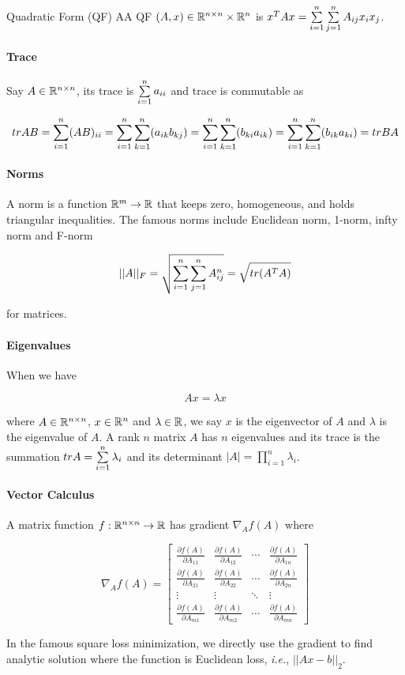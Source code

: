 \documentclass[a4,10pt]{ctexart}
\begin{document}
\begin{dn}{Quadratic Form (QF)}
AA QF $(A,x) \in \mathbb{R}^{n \times n} \times \mathbb{R}^n$ is $x^TAx = \sum \limits_{i=1}^n \sum \limits_{j=1}^n A_{ij} x_ix_j$.
\end{dn}

\paragraph{Trace}

Say $A \in \mathbb{R}^{n \times n}$, its trace is $\sum \limits_{i=1}^n a_{ii}$ and trace is commutable as

\begin{equation}
    trAB = \sum \limits_{i=1}^n (AB)_{ii} = \sum \limits_{i=1}^n \sum \limits_{k=1}^n (a_{ik} b_{kj}) = \sum \limits_{i=1}^n \sum \limits_{k=1}^n (b_{ki} a_{ik}) = \sum \limits_{i=1}^n \sum \limits_{k=1}^n (b_{ik} a_{ki}) = trBA
\end{equation}


\paragraph{Norms}

A norm is a function $\mathbb{R}^m \to \mathbb{R}$ that keeps zero, homogeneous, and holds triangular inequalities. The famous norms include Euclidean norm, 1-norm, infty norm and F-norm

$$||A||_F = \sqrt{ \sum \limits_{i=1}^n \sum \limits_{j=1}^n A_{ij}^n} = \sqrt{tr(A^TA)}$$

for matrices.

\paragraph{Eigenvalues}

When we have

\begin{equation}
    Ax = \lambda x
\end{equation}

where $A \in \mathbb{R}^{n \times n}$, $x \in \mathbb{R}^n$ and $\lambda \in \mathbb{R}$, we say $x$ is the eigenvector of $A$ and $\lambda$ is the eigenvalue of $A$. A rank $n$ matrix $A$ has $n$ eigenvalues and its trace is the summation $trA = \sum \limits_{i=1}^n \lambda_i$ and its determinant $|A| = \prod \limits_{i = 1} ^n \lambda_i$. 


\paragraph{Vector Calculus}

A matrix function $f: \mathbb{R}^{n \times n} \to \mathbb{R}$ has gradient $\nabla_A f(A)$ where

$$\nabla_A f(A) =
\begin{bmatrix}
\frac{\partial f(A)}{\partial A_{11}} & \frac{\partial f(A)}{\partial A_{12}} & \cdots & \frac{\partial f(A)}{\partial A_{1 n}} \\
\frac{\partial f(A)}{\partial A_{21}} & \frac{\partial f(A)}{\partial A_{22}} & \cdots & \frac{\partial f(A)}{\partial A_{2 n}} \\
\vdots & \vdots & \ddots & \vdots \\
\frac{\partial f(A)}{\partial A_{m 1}} & \frac{\partial f(A)}{\partial A_{m 2}} & \cdots & \frac{\partial f(A)}{\partial A_{m n}}
\end{bmatrix}
$$


\begin{rk}
In the famous square loss minimization, we directly use the gradient to find analytic solution where the function is Euclidean loss, \emph{i.e.}, $||Ax-b||_2$.
\end{rk}
\end{document}
